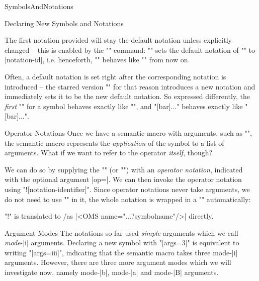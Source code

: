 \begin{smodule}[ns=https://github.com/slatex/sTeX/doc]{SymbolsAndNotations}
\begin{sfragment}{Declaring New Symbols and Notations}
\begin{function}{\setnotation}
  The first notation provided will stay the default notation unless explicitly changed --
  this is enabled by the \stexcode"\setnotation" command:
  \stexcode"" sets the default notation of
  \stexcode"\symbolname" to |notation-id|, i.e. henceforth, \stexcode"\symbolname" behaves
  like \stexcode"\symbolname[notation-id]" from now on.
\end{function}

Often, a default notation is set right after the corresponding notation is introduced --
the starred version \stexcode"\notation*" for that reason introduces a new notation and
immediately sets it to be the new default notation. So expressed differently, the
\emph{first} \stexcode"\notation" for a symbol behaves exactly like \stexcode"\notation*",
and \stexcode"[bar]{...}" behaves exactly like
\stexcode"[bar]{...}".
    
\begin{sfragment}{Operator Notations}
  Once we have a semantic macro with arguments, such as \stexcode"\newbinarysymbol", the
  semantic macro represents the \emph{application} of the symbol to a list of
  arguments. What if we want to refer to the operator \emph{itself}, though?

  We can do so by supplying the \stexcode"\notation" (or \stexcode"\symdef") with an
  \emph{operator notation}, indicated with the optional argument |op=|.  We can then
  invoke the operator notation using \stexcode"\symbolname![notation-identifier]".  Since
  operator notations never take arguments, we do not need to use \stexcode"\comp" in it,
  the whole notation is wrapped in a \stexcode"\comp" automatically:


  \begin{mmtbox}
    \stexcode"\symbolname!" is translated to \omdoc/\mmt as |<OMS name="...?symbolname"/>|
    directly.
  \end{mmtbox}

\end{sfragment}
\end{sfragment}

\begin{sfragment}{Argument Modes}
  The notations so far used \emph{simple} arguments which we call \emph{mode}-|i|
  arguments. Declaring a new symbol with \stexcode"[args=3]" is equivalent to
  writing \stexcode"[args=iii]", indicating that the semantic macro takes
  three mode-|i| arguments. However, there are three more argument modes which we will
  investigate now, namely mode-|b|, mode-|a| and mode-|B| arguments.


\end{sfragment}
\end{smodule}
